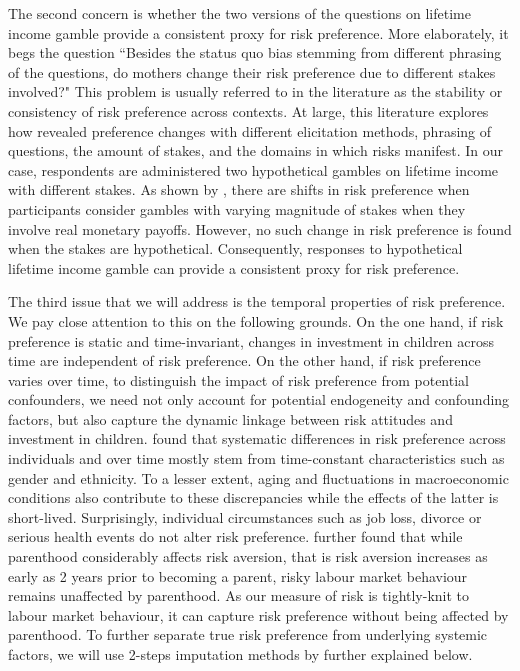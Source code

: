 \documentclass[]{article}
\begin{document}
The second concern is whether the two versions of the questions on lifetime income gamble provide a consistent proxy for risk preference. More elaborately, it begs the question ``Besides the status quo bias stemming from different phrasing of the questions, do mothers change their risk preference due to different stakes involved?" This problem is usually referred to in the literature as the stability or consistency of risk preference across contexts. At large, this literature explores how revealed preference changes with different elicitation methods, phrasing of questions, the amount of stakes, and the domains in which risks manifest. In our case, respondents are administered two hypothetical gambles on lifetime income with different stakes. As shown by \citet{holt2002risk}, there are shifts in risk preference when participants consider gambles with varying magnitude of stakes when they involve real monetary payoffs. However, no such change in risk preference is found when the stakes are hypothetical. Consequently, responses to hypothetical lifetime income gamble can provide a consistent proxy for risk preference.


The third issue that we will address is the temporal properties of risk preference. We pay close attention to this on the following grounds. On the one hand, if risk preference is static and time-invariant, changes in investment in children across time are independent of risk preference. On the other hand, if risk preference varies over time, to distinguish the impact of risk preference from potential confounders, we need not only account for potential endogeneity and confounding factors, but also capture the dynamic linkage between risk attitudes and investment in children. \citet{sahm2012much} found that systematic differences in risk preference across individuals and over time mostly stem from time-constant characteristics such as gender and ethnicity. To a lesser extent, aging and fluctuations in macroeconomic conditions also contribute to these discrepancies while the effects of the latter is short-lived. Surprisingly, individual circumstances such as job loss, divorce or serious health events do not alter risk preference. \citet{gorlitz2020parenthood} further found that while parenthood considerably affects risk aversion, that is risk aversion increases as early as 2 years prior to becoming a parent, risky labour market behaviour remains unaffected by parenthood. As our measure of risk is tightly-knit to labour market behaviour, it can capture risk preference without being affected by parenthood. To further separate true risk preference from underlying systemic factors, we will use 2-steps imputation methods by \citet{kimball2008imputing,kimball2009risk} further explained below.   
\end{document}
